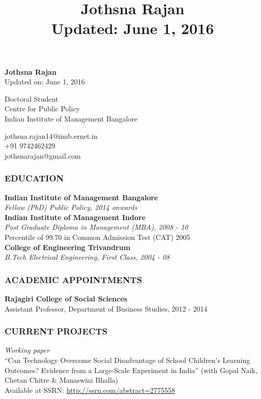 \documentclass[12pt, a4paper]{article}
\title{\textbf{Jothsna Rajan \\ \small{Updated: June 1, 2016} }}
\date{}
\begin{document}
	\begin{center}
		\large{\textbf{Jothsna Rajan}} \\
		\small{Updated on: June 1, 2016}
	\end{center}
	\begin{multicols}{2}
		\begin{flushleft}
			\noindent Doctoral Student \\
			Centre for Public Policy \\
			Indian Institute of Management Bangalore \\
		\end{flushleft}
		\begin{flushright}
			\noindent jothsna.rajan14@iimb.ernet.in \\
			+91 9742462429 \\
			jothsnarajan@gmail.com \\
		\end{flushright}
	\end{multicols}
	\subsubsection*{EDUCATION}
	
	\noindent\textbf{Indian Institute of Management Bangalore} \\
	\textit{Fellow (PhD) Public Policy, 2014 onwards} \\
	
	\noindent\textbf{Indian Institute of Management Indore} \\
	\textit{Post Graduate Diploma in Management (MBA), 2008 - 10} \\
	Percentile of 99.70 in Common Admission Test (CAT) 2005 \\
	
	\noindent\textbf{College of Engineering Trivandrum} \\
	\textit{B.Tech Electrical Engineering, First Class, 2004 - 08}
	
	\subsubsection*{ACADEMIC APPOINTMENTS}
		\noindent\textbf{Rajagiri College of Social Sciences} \\
		Assistant Professor, Department of Business Studies, 2012 - 2014 
	\subsubsection*{CURRENT PROJECTS}
		\noindent \textit{Working paper} \\
		``Can Technology Overcome Social Disadvantage of School Children's Learning Outcomes? Evidence from a Large-Scale Experiment in India'' (with Gopal Naik, Chetan Chitre \& Manaswini Bhalla) \\ Available at SSRN: \url{http://ssrn.com/abstract=2775558} 
\end{document}

